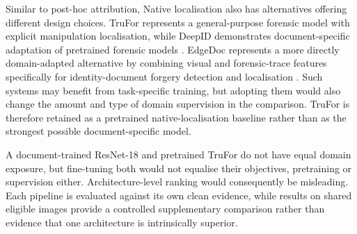 
Similar to post-hoc attribution, Native localisation also has alternatives offering different design choices. TruFor represents a general-purpose forensic model with explicit manipulation localisation, while DeepID demonstrates document-specific adaptation of pretrained forensic models \citep{korshunov2025deepid}. EdgeDoc represents a more directly domain-adapted alternative by combining visual and forensic-trace features specifically for identity-document forgery detection and localisation \citep{george2025edgedoc}. Such systems may benefit from task-specific training, but adopting them would also change the amount and type of domain supervision in the comparison. TruFor is therefore retained as a pretrained native-localisation baseline rather than as the strongest possible document-specific model.

A document-trained ResNet-18 and pretrained TruFor do not have equal domain exposure, but fine-tuning both would not equalise their objectives, pretraining or supervision either. Architecture-level ranking would consequently be misleading. Each pipeline is evaluated against its own clean evidence, while results on shared eligible images provide a controlled supplementary comparison rather than evidence that one architecture is intrinsically superior.






